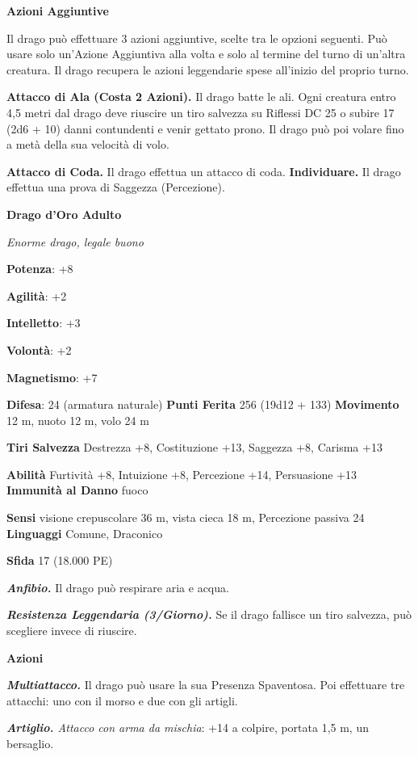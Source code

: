 \begin{multicols}{2}
\textbf{Azioni Aggiuntive}

Il drago può effettuare 3 azioni aggiuntive, scelte tra le opzioni
seguenti. Può usare solo un'Azione Aggiuntiva alla volta e solo al
termine del turno di un'altra creatura. Il drago recupera le azioni
leggendarie spese all'inizio del proprio turno.

\textbf{Attacco di Ala (Costa 2 Azioni).} Il drago batte le ali. Ogni
creatura entro 4,5 metri dal drago deve riuscire un tiro salvezza su Riflessi DC 25 o subire 17 (2d6 + 10) danni contundenti e venir gettato
prono. Il drago può poi volare fino a metà della sua velocità di volo.

\textbf{Attacco di Coda.} Il drago effettua un attacco di coda.
\textbf{Individuare.} Il drago effettua una prova di Saggezza
(Percezione).



\textbf{Drago d'Oro Adulto}

\emph{Enorme drago, legale buono}

\textbf{Potenza}: +8

\textbf{Agilità}: +2

\textbf{Intelletto}: +3

\textbf{Volontà}: +2

\textbf{Magnetismo}: +7

\textbf{Difesa}: 24 (armatura naturale) \textbf{Punti Ferita}
256 (19d12 + 133) \textbf{Movimento} 12 m, nuoto 12 m, volo 24 m

\textbf{Tiri Salvezza} Destrezza +8, Costituzione +13, Saggezza +8,
Carisma +13

\textbf{Abilità} Furtività +8, Intuizione +8, Percezione +14,
Persuasione +13 \textbf{Immunità al Danno} fuoco

\textbf{Sensi} visione crepuscolare 36 m, vista cieca 18 m, Percezione passiva
24 \textbf{Linguaggi} Comune, Draconico

\textbf{Sfida} 17 (18.000 PE)

\emph{\textbf{Anfibio.}} Il drago può respirare aria e acqua.

\emph{\textbf{Resistenza Leggendaria (3/Giorno).}} Se il drago fallisce
un tiro salvezza, può scegliere invece di riuscire.

\textbf{Azioni}

\emph{\textbf{Multiattacco.}} Il drago può usare la sua Presenza
Spaventosa. Poi effettuare tre attacchi: uno con il morso e due con gli
artigli.

\emph{\textbf{Artiglio.} Attacco con arma da mischia}: +14 a colpire,
portata 1,5 m, un bersaglio.


\end{multicols}
